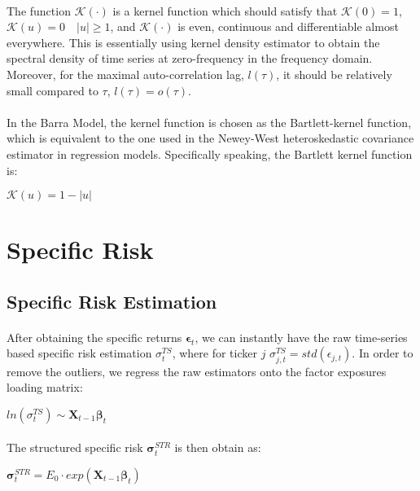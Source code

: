 \documentclass{article}
\begin{document}
\paragraph{}The function $\mathcal{K}(\cdot)$ is a kernel function which should satisfy that $\mathcal{K}(0) = 1$, $\mathcal{K}(u) = 0 \quad |u| \geq 1$,  and $\mathcal{K}(\cdot)$ is even, continuous and differentiable almost everywhere. This is essentially using kernel density estimator to obtain the spectral density of time series at zero-frequency in the frequency domain. Moreover, for the maximal auto-correlation lag, $l(\tau)$, it should be relatively small compared to $\tau$, $l(\tau) = o(\tau)$.
\paragraph{}In the Barra Model, the kernel function is chosen as the Bartlett-kernel function, which is equivalent to the one used in the Newey-West heteroskedastic covariance estimator in regression models. Specifically speaking, the Bartlett kernel function is:
\begin{center}
    $\mathcal{K}(u) = 1 - |u|$
\end{center}
\section{Specific Risk}
\subsection{Specific Risk Estimation}
\paragraph{}After obtaining the specific returns $\mathbf{\epsilon}_{t}$, we can instantly have the raw time-series based specific risk estimation $\mathcal{\sigma}_{t}^{TS}$, where for ticker $j$ $\sigma_{j,t}^{TS} = std(\epsilon_{j,t})$. In order to remove the outliers, we regress the raw estimators onto the factor exposures loading matrix:
\begin{center}
    $ln(\mathcal{\sigma}_{t}^{TS}) \sim \mathbf{X}_{t-1}\mathbf{\beta}_{t}$
\end{center}
\paragraph{}The structured specific risk $\mathbf{\sigma}_{t}^{STR}$ is then obtain as:
\begin{center}
    $\mathbf{\sigma}_{t}^{STR} = E_{0} \cdot exp(\mathbf{X}_{t-1}\mathbf{\beta}_{t})$
\end{center}
\end{document}
